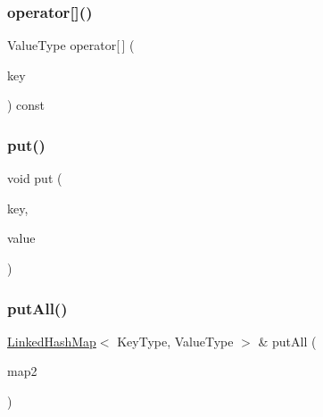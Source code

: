 \mbox{\label{classLinkedHashMap_a9f52896b148cfbbc16e12ad1008971b1}} 
\subsubsection{\texorpdfstring{operator[]()}{operator[]()}}
{\footnotesize\ttfamily Value\+Type operator\mbox{[}$\,$\mbox{]} (\begin{DoxyParamCaption}\item[{const Key\+Type \&}]{key }\end{DoxyParamCaption}) const}

\mbox{\label{classLinkedHashMap_af0d1d70a37332cb3054fe5b1b170927c}} 
\subsubsection{\texorpdfstring{put()}{put()}}
{\footnotesize\ttfamily void put (\begin{DoxyParamCaption}\item[{const Key\+Type \&}]{key,  }\item[{const Value\+Type \&}]{value }\end{DoxyParamCaption})}

\mbox{\label{classLinkedHashMap_a6a0e6f4c23d4e1e470e793b19ab62b52}} 
\subsubsection{\texorpdfstring{put\+All()}{putAll()}\hspace{0.1cm}{\footnotesize\ttfamily [1/2]}}
{\footnotesize\ttfamily \mbox{\hyperlink{classLinkedHashMap}{Linked\+Hash\+Map}}$<$ Key\+Type, Value\+Type $>$ \& put\+All (\begin{DoxyParamCaption}\item[{const \mbox{\hyperlink{classLinkedHashMap}{Linked\+Hash\+Map}}$<$ Key\+Type, Value\+Type $>$ \&}]{map2 }\end{DoxyParamCaption})}

